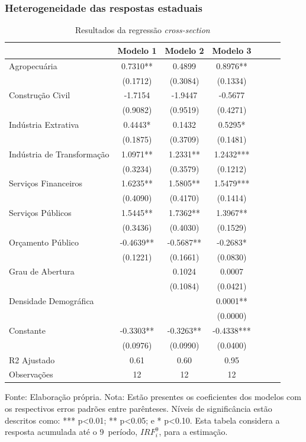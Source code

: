 \subsubsection{Heterogeneidade das respostas estaduais}
\begin{table}[htb!]
\caption{Resultados da regressão \textit{cross-section}}
\label{table:cross_section_results}
\vspace{0.25cm}
\small
\begin{center}
\begin{tabular}{l c c c c c c
    }
  \hline
& Modelo 1 & Modelo 2 & Modelo 3 \\
  \hline
Agropecuária & 0.7310** & 0.4899 & 0.8976** \\
 & (0.1712) & (0.3084) & (0.1334) \\
Construção Civil & -1.7154 & -1.9447 & -0.5677 \\
 & (0.9082) & (0.9519) & (0.4271) \\
Indústria Extrativa & 0.4443* & 0.1432 & 0.5295* \\
 & (0.1875) & (0.3709) & (0.1481) \\
Indústria de Transformação & 1.0971** & 1.2331** & 1.2432*** \\
 & (0.3234) & (0.3579) & (0.1212) \\
Serviços Financeiros & 1.6235** & 1.5805** & 1.5479*** \\
 & (0.4090) & (0.4170) & (0.1414) \\
Serviços Públicos & 1.5445** & 1.7362** & 1.3967** \\
 & (0.3436) & (0.4030) & (0.1529) \\
Orçamento Público & -0.4639** & -0.5687** & -0.2683* \\
 & (0.1221) & (0.1661) & (0.0830) \\
Grau de Abertura &  & 0.1024 & 0.0007 \\
 &  & (0.1084) & (0.0421) \\ 
Densidade Demográfica &  &  & 0.0001** \\
 &  &  & (0.0000) \\
Constante & -0.3303** & -0.3263** & -0.4338*** \\
 & (0.0976) & (0.0990) & (0.0400) \\
\hline
R2 Ajustado & 0.61 & 0.60 & 0.95 \\
Observações & 12 & 12 & 12 \\
\hline
\end{tabular}
\end{center}
Fonte: Elaboração própria. \newline
Nota: Estão presentes os coeficientes dos modelos com os respectivos erros padrões entre parênteses. Níveis de significância estão descritos como: *** p<0.01; ** p<0.05; e * p<0.10. Esta tabela considera a resposta acumulada até o 9\textordmasculine\ período, $IRF_{i}^{9}$, para a estimação.
\end{table}

